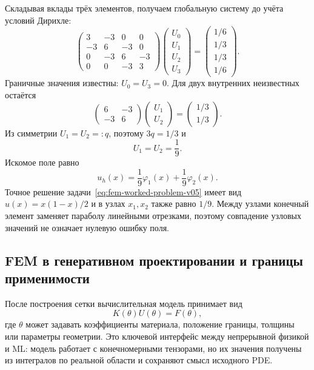 Складывая вклады трёх элементов, получаем глобальную систему до учёта условий Дирихле:
\begin{equation}
\label{eq:global-fem-system-v05}
 \begin{pmatrix}
 3&-3&0&0\\
 -3&6&-3&0\\
 0&-3&6&-3\\
 0&0&-3&3
 \end{pmatrix}
 \begin{pmatrix}
 U_0\\U_1\\U_2\\U_3
 \end{pmatrix}
 =
 \begin{pmatrix}
 1/6\\1/3\\1/3\\1/6
 \end{pmatrix}.
\end{equation}
Граничные значения известны: $U_0=U_3=0$. Для двух внутренних неизвестных остаётся
\begin{equation}
\label{eq:reduced-fem-system-v05}
 \begin{pmatrix}
 6&-3\\
 -3&6
 \end{pmatrix}
 \begin{pmatrix}
 U_1\\U_2
 \end{pmatrix}
 =
 \begin{pmatrix}
 1/3\\1/3
 \end{pmatrix}.
\end{equation}
Из симметрии $U_1=U_2=:q$, поэтому $3q=1/3$ и
\begin{equation}
\label{eq:fem-worked-solution-v05}
 U_1=U_2=\frac19.
\end{equation}
Искомое поле равно
\[
 u_h(x)=\frac19\varphi_1(x)+\frac19\varphi_2(x).
\]
Точное решение задачи~\eqref{eq:fem-worked-problem-v05} имеет вид $u(x)=x(1-x)/2$ и в узлах $x_1,x_2$ также равно $1/9$. Между узлами конечный элемент заменяет параболу линейными отрезками, поэтому совпадение узловых значений не означает нулевую ошибку поля.

\subsection{FEM в генеративном проектировании и границы применимости}

После построения сетки вычислительная модель принимает вид
\begin{equation}
\label{eq:fem-design-system-v05}
 K(\theta)U(\theta)=F(\theta),
\end{equation}
где $\theta$ может задавать коэффициенты материала, положение границы, толщины или параметры геометрии. Это ключевой интерфейс между непрерывной физикой и ML: модель работает с конечномерными тензорами, но их значения получены из интегралов по реальной области и сохраняют смысл исходного PDE.

